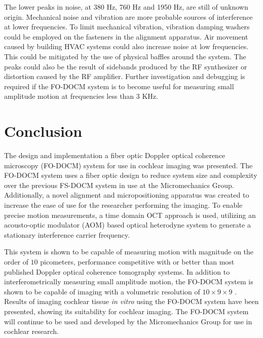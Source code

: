 The lower peaks in noise, at 380 Hz, 760 Hz and 1950 Hz, are still of unknown origin. Mechanical noise and vibration are more probable sources of interference at lower frequencies. To limit mechanical vibration, vibration damping washers could be employed on the fasteners in the alignment apparatus. Air movement caused by building HVAC systems could also increase noise at low frequencies. This could be mitigated by the use of physical baffles around the system. The peaks could also be the result of sidebands produced by the RF synthesizer or distortion caused by the RF amplifier. Further investigation and debugging is required if the FO-DOCM system is to become useful for measuring small amplitude motion at frequencies less than 3 KHz.


\section{Conclusion}

The design and implementation a fiber optic Doppler optical coherence microscopy (FO-DOCM) system for use in cochlear imaging was presented. The FO-DOCM system uses a fiber optic design to reduce system size and complexity over the previous FS-DOCM system in use at the Micromechanics Group. Additionally, a novel alignment and micropositioning apparatus was created to increase the ease of use for the researcher performing the imaging. To enable precise motion measurements, a time domain OCT approach is used, utilizing an acousto-optic modulator (AOM) based optical heterodyne system to generate a stationary interference carrier frequency.

This system is shown to be capable of measuring motion with magnitude on the order of $10$ picometers, performance competitive with or better than most published Doppler optical coherence tomography systems. In addition to interferometrically measuring small amplitude motion, the FO-DOCM system is shown to be capable of imaging with a volumetric resolution of $10 \times 9 \times 9$ \micron. Results of imaging cochlear tissue {\em in vitro} using the FO-DOCM system have been presented, showing its suitability for cochlear imaging. The FO-DOCM system will continue to be used and developed by the Micromechanics Group for use in cochlear research.
